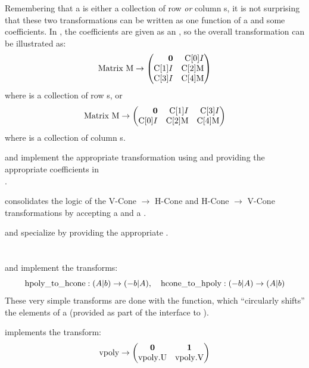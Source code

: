 Remembering that a  is either a collection of row \textit{or} column s, it is not surprising that these two transformations can be written as one function of a  and some coefficients.  In , the coefficients are given as an , so the overall transformation can be illustrated as:
\newcommand{\CA}[1]{\mli{C[#1]}}
\[ \mli{Matrix M} \to
	\begin{pmatrix*}[r]
		\0 & \CA{0}I \\
		\CA{1}I & \CA{2}\mli{M} \\
		\CA{3}I & \CA{4}\mli{M}
	\end{pmatrix*} \]
where  is a collection of row s, or
\[ \mli{Matrix M} \to
	\begin{pmatrix*}[r]
		\0 & \CA{1}I & \CA{3}I \\
		\CA{0}I & \CA{2}\mli{M} & \CA{4}\mli{M}
	\end{pmatrix*} \]
where  is a collection of column s.
\lstgeneralizedlift

 and  implement the appropriate transformation using  and providing the appropriate coefficients in \\
.
\lstliftvcone
\lstlifthcone

 consolidates the logic of the V-Cone $\to$ H-Cone and H-Cone $\to$ V-Cone transformations by accepting a  and a .
\lstconetransform

 and  specialize  by providing the appropriate .
\lstvconetohcone
\lsthconetovcone

\section{}

 and  implement the  transforms:
\[ \mli{hpoly_to_hcone}: (A|b) \to (-b|A),\quad \mli{hcone_to_hpoly} : (-b|A) \to (A|b) \]
These very simple transforms are done with the  function, which ``circularly shifts'' the elements of a  (provided as part of the interface to ).
\lsthpolytohcone
\lsthconetohpoly

 implements the  transform:
\[ \mli{vpoly} \to
	\begin{pmatrix}
		\0 & \vec{1} \\ \mli{vpoly.U} & \mli{vpoly.V}
	\end{pmatrix} \]
\lstvpolytovcone

